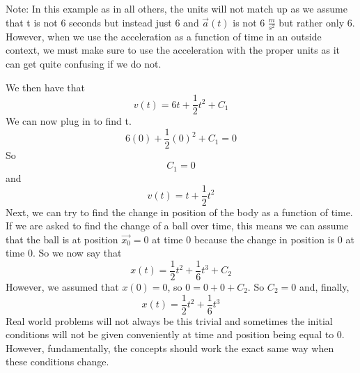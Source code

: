 Note: In this example as in all others, the units will not match up as we assume that t is not 6 seconds but instead just 6 and $\vec{a}\left(t\right)$ is not 6 $\frac{m}{s^2}$ but rather only 6. However, when we use the acceleration as a function of time in an outside context, we must make sure to use the acceleration with the proper units as it can get quite confusing if we do not. 

We then have that \begin{equation}v\left(t\right)=6t+\frac{1}{2}t^2+C_1\end{equation} We can now plug in to find t. \begin{equation}6\left(0\right)+\frac{1}{2}\left(0\right)^2+C_1=0\end{equation} So $$C_1 = 0$$ and \begin{equation}v\left(t\right)=t+\frac{1}{2}t^2\end{equation} Next, we can try to find the change in position of the body as a function of time. If we are asked to find the change of a ball over time, this means we can assume that the ball is at position $\vec{x_0} = 0$ at time 0 because the change in position is 0 at time 0. So we now say that \begin{equation}x\left(t\right)=\frac{1}{2}t^2+\frac{1}{6}t^3+C_2\end{equation} However, we assumed that $x\left(0\right)=0$, so $0=0+0+C_2$. So $C_2=0$ and, finally, \begin{equation}x\left(t\right)=\frac{1}{2}t^2+\frac{1}{6}t^3\end{equation} Real world problems will not always be this trivial and sometimes the initial conditions will not be given conveniently at time and position being equal to 0. However, fundamentally, the concepts should work the exact same way when these conditions change.
\newline
\newline
{}
\clearpage